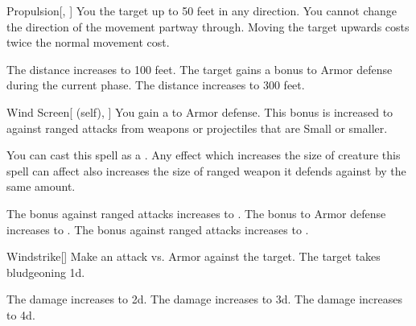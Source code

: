 \lowercase{\hypertarget{spell:Propulsion}{}}\label{spell:Propulsion}
\begin{freeability}[Rank 1]{\hypertarget{spell:Propulsion}{Propulsion}}[, ]
You  the target up to 50 feet in any direction.
You cannot change the direction of the movement partway through.
Moving the target upwards costs twice the normal movement cost.

\rankline
{} The distance increases to 100 feet.
 The target gains a  bonus to Armor defense during the current phase.
 The distance increases to 300 feet.
\end{freeability}
\vspace{0.25em}



\lowercase{\hypertarget{spell:Wind Screen}{}}\label{spell:Wind Screen}
\begin{attuneability}[Rank 1]{\hypertarget{spell:Wind Screen}{Wind Screen}}[ (self), ]
You gain a   to Armor defense.
This bonus is increased to  against  ranged attacks from weapons or projectiles that are Small or smaller.

You can cast this spell as a .
Any effect which increases the size of creature this spell can affect also increases the size of ranged weapon it defends against by the same amount.

\rankline
{} The bonus against ranged attacks increases to .
 The bonus to Armor defense increases to .
 The bonus against ranged attacks increases to .
\end{attuneability}
\vspace{0.25em}



\lowercase{\hypertarget{spell:Windstrike}{}}\label{spell:Windstrike}
\begin{freeability}[Rank 1]{\hypertarget{spell:Windstrike}{Windstrike}}[]
Make an attack vs. Armor against the target.
\hit The target takes bludgeoning  \plus1d.

\rankline
{} The damage increases to  \plus2d.
 The damage increases to  \plus3d.
 The damage increases to  \plus4d.
\end{freeability}
\vspace{0.25em}



